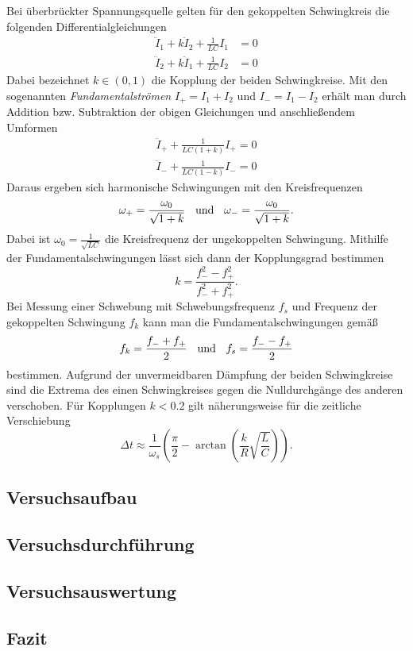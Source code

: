 \documentclass[a4paper, 12pt]{scrartcl}
\begin{document}
Bei überbrückter Spannungsquelle gelten für den gekoppelten Schwingkreis die folgenden Differentialgleichungen 
\begin{align*}
\ddot I_1 + k \ddot I_2 + \frac{1}{LC}I_1 &= 0 \\
\ddot I_2 + k \ddot I_1 + \frac{1}{LC}I_2 &= 0
\end{align*}
Dabei bezeichnet $k \in (0,1)$ die Kopplung der beiden Schwingkreise. 
Mit den sogenannten \textit{Fundamentalströmen} $I_+ = I_1 + I_2$ und $I_- = I_1 - I_2$ erhält man durch Addition bzw. Subtraktion der obigen Gleichungen und anschließendem Umformen
\begin{align*}
\ddot I_+ + \frac{1}{LC(1+k)} I_+ = 0 \\
\ddot I_- + \frac{1}{LC(1-k)} I_- = 0
\end{align*}
Daraus ergeben sich harmonische Schwingungen mit den Kreisfrequenzen 
$$\omega_+ = \frac{\omega_0}{\sqrt{1+k}} \hspace{0.2cm} \text{ und } \hspace{0.2cm} \omega_- = \frac{\omega_0}{\sqrt{1+k}}.$$
Dabei ist $\omega_0 = \frac{1}{\sqrt{LC}}$ die Kreisfrequenz der ungekoppelten Schwingung. Mithilfe der Fundamentalschwingungen lässt sich dann der Kopplungsgrad bestimmen
$$k = \frac{f_-^2 - f_+^2}{f_-^2 + f_+^2}.$$
Bei Messung einer Schwebung mit Schwebungsfrequenz $f_s$ und Frequenz der gekoppelten Schwingung $f_k$ kann man die Fundamentalschwingungen gemäß
$$f_k = \frac{f_- + f_+}{2} \hspace{0.2cm} \text{ und } \hspace{0.2cm} f_s = \frac{f_- - f_+}{2}$$
bestimmen. Aufgrund der unvermeidbaren Dämpfung der beiden Schwingkreise sind die Extrema des einen Schwingkreises gegen die Nulldurchgänge des anderen verschoben. Für Kopplungen $k < 0.2$ gilt näherungsweise für die zeitliche Verschiebung
$$\Delta t \approx \frac{1}{\omega_s} \left( \frac{\pi}{2} - \arctan\left(  \frac kR \sqrt{\frac LC}\right) \right).$$


\subsection{Versuchsaufbau}

\subsection{Versuchsdurchführung}

\subsection{Versuchsauswertung}

\subsection{Fazit}
\end{document}
